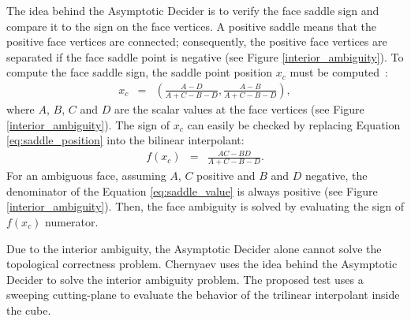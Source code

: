 The idea behind the Asymptotic Decider is to verify the face saddle sign and compare it to the sign on the face vertices. A positive saddle means that the positive face vertices are connected; consequently, the positive face vertices are separated if the face saddle point is negative (see Figure \ref{interior_ambiguity}). To compute the face saddle sign, the saddle point position $x_c$ must be computed~\cite{Chernyaev95marchingcubes}:
\begin{eqnarray}
x_c & = & \left( \frac{A - D}{A+C-B-D}, \frac{A - B}{A+C-B-D} \right), \label{eq:saddle_position}
\end{eqnarray}
where $A$, $B$, $C$ and $D$ are the scalar values at the face vertices (see Figure \ref{interior_ambiguity}).
%
The sign of $x_c$ can easily be checked by replacing Equation \eqref{eq:saddle_position} into the bilinear interpolant:
\begin{eqnarray}
f(x_c) & = & \frac{AC - BD}{A+C-B-D}.\label{eq:saddle_value}
\end{eqnarray}
For an ambiguous face, assuming $A$, $C$ positive and $B$ and $D$ negative, the denominator of the Equation \eqref{eq:saddle_value} is always positive (see Figure \ref{interior_ambiguity}). Then, the face ambiguity is solved by evaluating the sign of $f(x_c)$ numerator.


%
Due to the interior ambiguity, the Asymptotic Decider alone cannot solve the topological correctness problem. Chernyaev uses the idea behind the Asymptotic Decider to solve the interior ambiguity problem. The proposed test uses a  sweeping cutting-plane to evaluate the behavior of the trilinear interpolant inside the cube.
%

